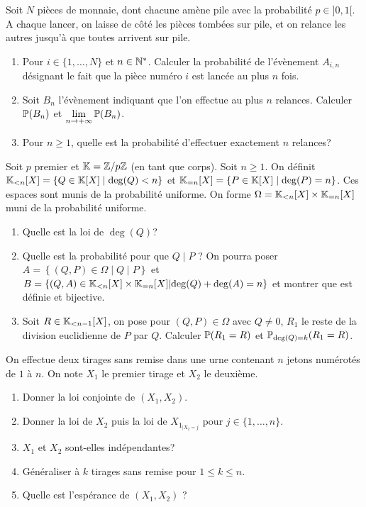 \documentclass[12pt]{article}
\begin{document}
\begin{exercise}
	Soit $N$ pièces de monnaie, dont chacune amène pile avec la probabilité
	$p\in]0,1[$. A chaque lancer, on laisse de côté les pièces tombées sur pile,
	et on relance les autres jusqu'à que toutes arrivent sur pile.
	\begin{enumerate}
		\item
		Pour $i\in\{1,\dots,N\}$ et $n\in\N^{*}$. Calculer la probabilité de
		l'évènement $A_{i,n}$ désignant le fait que la pièce numéro $i$ est lancée
		au plus $n$ fois.
		\item
		Soit $B_{n}$ l'évènement indiquant que l'on effectue au plus $n$ relances.
		Calculer $\P(B_{n})$ et $\lim\limits_{n\to+\infty}\P(B_{n})$.
		\item
		Pour $n\geqslant1$, quelle est la probabilité d'effectuer exactement $n$
		relances?
	\end{enumerate}
\end{exercise}

\begin{exercise}
	Soit $p$ premier et $\K=\Z/p\Z$ (en tant que corps). Soit $n\geqslant1$. On
	définit $\K_{<n}[X]=\{Q\in\K[X]\mid \deg(Q)<n\}$ et
	$\K_{=n}[X]=\{P\in\K[X]\mid \deg(P)=n\}$. Ces espaces sont munis de la
	probabilité uniforme. On forme $\Omega=\K_{<n}[X]\times\K_{=n}[X]$ muni de la
	probabilité uniforme.
	\begin{enumerate}
		\item
		Quelle est la loi de $\deg(Q)$?
		\item
		Quelle est la probabilité pour que $Q\mid P$ ? On pourra poser $A=\left\lbrace(Q,P)\in\Omega\middle| Q\mid P\right\rbrace$ et $B=\left\lbrace(Q,A)\in\K_{<n}[X]\times\K_{=n}[X]\middle|\deg(Q)+\deg(A)=n\right\rbrace$ et montrer que  est définie et bijective.
		\item
		Soit $R\in\K_{<n-1}[X]$, on pose pour $(Q,P)\in\Omega$ avec $Q\neq0$,
		$R_{1}$ le reste de la division euclidienne de $P$ par $Q$. Calculer
		$\P(R_{1}=R)$ et $\P_{\deg(Q)=k}(R_{1}=R)$.
	\end{enumerate}
\end{exercise}

\begin{exercise}
	On effectue deux tirages sans remise dans une urne contenant $n$ jetons
	numérotés de $1$ à $n$. On note $X_{1}$ le premier tirage et $X_{2}$ le
	deuxième.
	\begin{enumerate}
		\item
		Donner la loi conjointe de $(X_{1},X_{2})$.
		\item
		Donner la loi de $X_{2}$ puis la loi de $X_{{1}_{\mid X_{2}=j}}$ pour
		$j\in\{1,\dots,n\}$.
		\item
		$X_{1}$ et $X_{2}$ sont-elles indépendantes?
		\item
		Généraliser à $k$ tirages sans remise pour $1\leqslant k\leqslant n$.
		\item Quelle est l'espérance de $(X_{1},X_{2})$ ?
	\end{enumerate}
\end{exercise}
\end{document}
